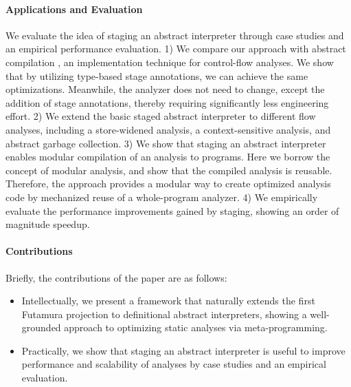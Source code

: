 \paragraph{Applications and Evaluation}
We evaluate the idea of staging an abstract interpreter through
case studies and an empirical performance evaluation.
1) We compare our approach with abstract compilation
\cite{Boucher:1996:ACN:647473.727587}, an implementation technique for
control-flow analyses. We show that by utilizing type-based stage
annotations, we can achieve the same optimizations. Meanwhile,
the analyzer does not need to change, except the addition of stage annotations,
thereby requiring significantly less engineering effort.
2) We extend the basic staged abstract interpreter to different flow
analyses, including a store-widened analysis, a context-sensitive
analysis, and abstract garbage collection.
3) We show that staging an abstract interpreter enables modular
compilation of an analysis to programs. Here we borrow the concept of
modular analysis, and show that the compiled analysis is reusable.
Therefore, the approach provides a modular way to create optimized
analysis code by mechanized reuse of a whole-program analyzer.
4) We empirically evaluate the performance improvements gained by staging,
showing an order of magnitude speedup.

\paragraph{Contributions} Briefly, the contributions of the paper are as follows:
\begin{itemize}[leftmargin=2em]
  \item Intellectually, we present a framework that naturally extends the first
    Futamura projection to definitional abstract interpreters, showing a
    well-grounded approach to optimizing static analyses via meta-programming.
  \item Practically, we show that staging an abstract interpreter is useful to
    improve performance and scalability of analyses by case studies and an
    empirical evaluation.
\end{itemize}

